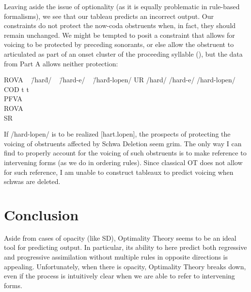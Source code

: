\documentclass[doc,12pt]{apa6}
\begin{document}
\noindent

Leaving aside the issue of optionality (as it is equally problematic in
rule-based formalisms), we see that our tableau predicts an incorrect output.
Our constraints do not protect the now-coda obstruents when, in fact, they
should remain unchanged. We might be tempted to posit a constraint that allows
for voicing to be protected by preceding sonorants, or else allow the obstruent
to articulated as part of an onset cluster of the proceeding syllable
(), but the data from Part A
allows neither protection:

\begin{minipage}{\textwidth}
\begin{exe}
	\ex \begin{tabbing}
		ROVA ~ \= /har\=d/ ~ \= /hard-e/ ~ \= /har\=d-lopen/ \kill
		UR   \> /hard/ \>  \> /hard-e/ \> /hard-lopen/ \\
		COD  \> \>t \> \> \>t \\
		PFVA \\
		ROVA \\
		SR \> [hart] \> \> [har.de] 
		\end{tabbing}
\end{exe}
\end{minipage}

If /hard-lopen/ is to be realized [hart.lopen], the prospects of protecting the
voicing of obstruents affected by Schwa Deletion seem grim. The only way I can
find to properly account for the voicing of such obstruents is to make
reference to intervening forms (as we do in ordering rules). Since classical OT
does not allow for such reference, I am unable to construct tableaux to predict
voicing when schwas are deleted.

\section{Conclusion}

Aside from cases of opacity (like SD), Optimality Theory seems to be an ideal
tool for predicting output. In particular, its ability to here predict both
regressive and progressive assimilation without multiple rules in opposite
directions is appealing. Unfortunately, when there is opacity, Optimality
Theory breaks down, even if the process is intuitively clear when we are able
to refer to intervening forms.
\end{document}
